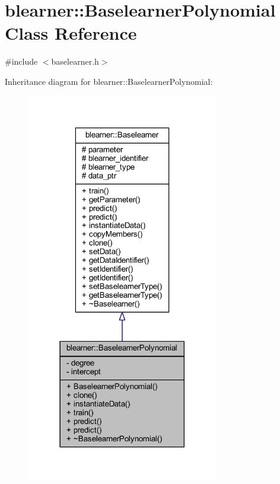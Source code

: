 \hypertarget{classblearner_1_1_baselearner_polynomial}{}\section{blearner\+:\+:Baselearner\+Polynomial Class Reference}
\label{classblearner_1_1_baselearner_polynomial}


{\ttfamily \#include $<$baselearner.\+h$>$}



Inheritance diagram for blearner\+:\+:Baselearner\+Polynomial\+:\nopagebreak
\begin{figure}[H]
\begin{center}
\leavevmode
\includegraphics[width=237pt]{classblearner_1_1_baselearner_polynomial__inherit__graph}
\end{center}
\end{figure}


